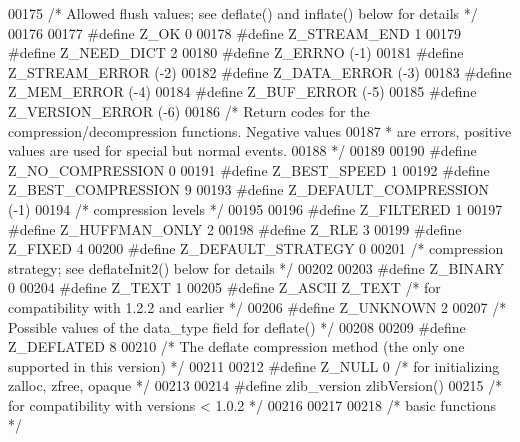 \begin{DoxyCode}
00175 \textcolor{comment}{/* Allowed flush values; see deflate() and inflate() below for details */}
00176 
00177 \textcolor{preprocessor}{#define Z\_OK            0}
00178 \textcolor{preprocessor}{#define Z\_STREAM\_END    1}
00179 \textcolor{preprocessor}{#define Z\_NEED\_DICT     2}
00180 \textcolor{preprocessor}{#define Z\_ERRNO        (-1)}
00181 \textcolor{preprocessor}{#define Z\_STREAM\_ERROR (-2)}
00182 \textcolor{preprocessor}{#define Z\_DATA\_ERROR   (-3)}
00183 \textcolor{preprocessor}{#define Z\_MEM\_ERROR    (-4)}
00184 \textcolor{preprocessor}{#define Z\_BUF\_ERROR    (-5)}
00185 \textcolor{preprocessor}{#define Z\_VERSION\_ERROR (-6)}
00186 \textcolor{comment}{/* Return codes for the compression/decompression functions. Negative values}
00187 \textcolor{comment}{ * are errors, positive values are used for special but normal events.}
00188 \textcolor{comment}{ */}
00189 
00190 \textcolor{preprocessor}{#define Z\_NO\_COMPRESSION         0}
00191 \textcolor{preprocessor}{#define Z\_BEST\_SPEED             1}
00192 \textcolor{preprocessor}{#define Z\_BEST\_COMPRESSION       9}
00193 \textcolor{preprocessor}{#define Z\_DEFAULT\_COMPRESSION  (-1)}
00194 \textcolor{comment}{/* compression levels */}
00195 
00196 \textcolor{preprocessor}{#define Z\_FILTERED            1}
00197 \textcolor{preprocessor}{#define Z\_HUFFMAN\_ONLY        2}
00198 \textcolor{preprocessor}{#define Z\_RLE                 3}
00199 \textcolor{preprocessor}{#define Z\_FIXED               4}
00200 \textcolor{preprocessor}{#define Z\_DEFAULT\_STRATEGY    0}
00201 \textcolor{comment}{/* compression strategy; see deflateInit2() below for details */}
00202 
00203 \textcolor{preprocessor}{#define Z\_BINARY   0}
00204 \textcolor{preprocessor}{#define Z\_TEXT     1}
00205 \textcolor{preprocessor}{#define Z\_ASCII    Z\_TEXT   }\textcolor{comment}{/* for compatibility with 1.2.2 and earlier */}\textcolor{preprocessor}{}
00206 \textcolor{preprocessor}{#define Z\_UNKNOWN  2}
00207 \textcolor{comment}{/* Possible values of the data\_type field for deflate() */}
00208 
00209 \textcolor{preprocessor}{#define Z\_DEFLATED   8}
00210 \textcolor{comment}{/* The deflate compression method (the only one supported in this version) */}
00211 
00212 \textcolor{preprocessor}{#define Z\_NULL  0  }\textcolor{comment}{/* for initializing zalloc, zfree, opaque */}\textcolor{preprocessor}{}
00213 
00214 \textcolor{preprocessor}{#define zlib\_version zlibVersion()}
00215 \textcolor{comment}{/* for compatibility with versions < 1.0.2 */}
00216 
00217 
00218                         \textcolor{comment}{/* basic functions */}

\end{DoxyCode}
